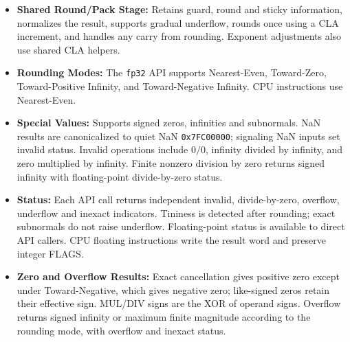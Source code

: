 \documentclass[11pt,a4paper]{article}
\begin{document}
\begin{itemize}
\begin{itemize}
        \item The corrected quotient retains 27 bits. A nonzero exact remainder is jammed into its low sticky bit, allowing the shared rounding stage to apply the selected rounding rule.
    \end{itemize}
    \item \textbf{Shared Round/Pack Stage:} Retains guard, round and sticky information, normalizes the result, supports gradual underflow, rounds once using a CLA increment, and handles any carry from rounding. Exponent adjustments also use shared CLA helpers.
    \item \textbf{Rounding Modes:} The \texttt{fp32} API supports Nearest-Even, Toward-Zero, Toward-Positive Infinity, and Toward-Negative Infinity. CPU instructions use Nearest-Even.
    \item \textbf{Special Values:} Supports signed zeros, infinities and subnormals. NaN results are canonicalized to quiet NaN \texttt{0x7FC00000}; signaling NaN inputs set invalid status. Invalid operations include $0/0$, infinity divided by infinity, and zero multiplied by infinity. Finite nonzero division by zero returns signed infinity with floating-point divide-by-zero status.
    \item \textbf{Status:} Each API call returns independent invalid, divide-by-zero, overflow, underflow and inexact indicators. Tininess is detected after rounding; exact subnormals do not raise underflow. Floating-point status is available to direct API callers. CPU floating instructions write the result word and preserve integer FLAGS.
    \item \textbf{Zero and Overflow Results:} Exact cancellation gives positive zero except under Toward-Negative, which gives negative zero; like-signed zeros retain their effective sign. MUL/DIV signs are the XOR of operand signs. Overflow returns signed infinity or maximum finite magnitude according to the rounding mode, with overflow and inexact status.
\end{itemize}
\end{document}
